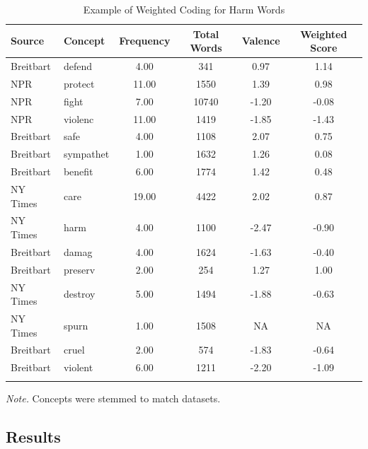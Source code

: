 \documentclass[
  man,floatsintext]{apa6}
\begin{document}
\begin{table}[h]

\begin{center}
\begin{threeparttable}

\caption{\label{tab:example-weight}Example of Weighted Coding for Harm Words}

\footnotesize{

\begin{tabular}{llcccc}
\toprule
Source & Concept & Frequency & Total Words & Valence & Weighted Score\\
\midrule
Breitbart & defend & 4.00 & 341 & 0.97 & 1.14\\
NPR & protect & 11.00 & 1550 & 1.39 & 0.98\\
NPR & fight & 7.00 & 10740 & -1.20 & -0.08\\
NPR & violenc & 11.00 & 1419 & -1.85 & -1.43\\
Breitbart & safe & 4.00 & 1108 & 2.07 & 0.75\\
Breitbart & sympathet & 1.00 & 1632 & 1.26 & 0.08\\
Breitbart & benefit & 6.00 & 1774 & 1.42 & 0.48\\
NY Times & care & 19.00 & 4422 & 2.02 & 0.87\\
NY Times & harm & 4.00 & 1100 & -2.47 & -0.90\\
Breitbart & damag & 4.00 & 1624 & -1.63 & -0.40\\
Breitbart & preserv & 2.00 & 254 & 1.27 & 1.00\\
NY Times & destroy & 5.00 & 1494 & -1.88 & -0.63\\
NY Times & spurn & 1.00 & 1508 & NA & NA\\
Breitbart & cruel & 2.00 & 574 & -1.83 & -0.64\\
Breitbart & violent & 6.00 & 1211 & -2.20 & -1.09\\
\bottomrule
\addlinespace
\end{tabular}

}

\begin{tablenotes}[para]
\normalsize{\textit{Note.} Concepts were stemmed to match datasets.}
\end{tablenotes}

\end{threeparttable}
\end{center}

\end{table}

\subsection{Results}\label{results-3}
\end{document}

